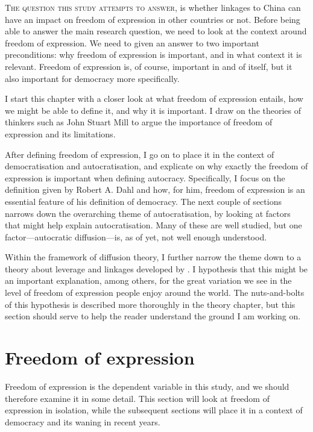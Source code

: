 \lettrine{T}{he question this study attempts to answer}, is whether linkages to China can have an impact on freedom of expression in other countries or not.  Before being able to answer the main research question, we need to look at the context around freedom of expression. We need to given an answer to two important preconditions: why freedom of expression is important,  and in what context it is relevant. Freedom of expression is, of course, important in and of itself, but it also important for democracy more specifically.  

I start this chapter with a closer look at what freedom of expression entails, how we might be able to define it, and why it is important.  I draw on the theories of thinkers such as John Stuart Mill to argue the importance of freedom of expression and its limitations.

After defining freedom of expression, I go on to place it in the context of democratisation and autocratisation, and explicate on why exactly the freedom of expression is important when defining autocracy. Specifically, I focus on the definition given by Robert A. Dahl and how, for him, freedom of expression is an essential feature of his definition of democracy. The next couple of sections narrows down the overarching theme of autocratisation, by looking at factors that might help explain autocratisation. Many of these are well studied, but one factor---autocratic diffusion---is, as of yet, not well enough understood. 

Within the framework of diffusion theory, I further narrow the theme down to a theory about leverage and linkages developed by \citet{levitsky_linkage_2006}. I hypothesis that this might be an important explanation, among others, for the great variation we see in the level of freedom of expression people enjoy around the world. The nuts-and-bolts of this hypothesis is described more thoroughly in the theory chapter, but this section should serve to help the reader understand the ground I am working on. 

\section{Freedom of expression}
Freedom of expression is the dependent variable in this study, and we should therefore examine it in some detail. This section will look at freedom of expression in isolation, while the subsequent sections will place it in a context of democracy and its waning in recent years. 

